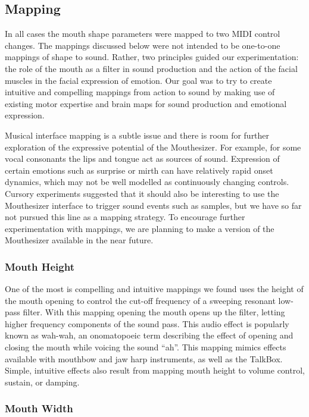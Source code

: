 \subsection{Mapping}

In all cases the mouth shape parameters were mapped to two MIDI control changes. The mappings discussed below were not intended to be one-to-one mappings of shape to sound. Rather, two principles guided our experimentation: the role of the mouth as a filter in sound production and the action of the facial muscles in the facial expression of emotion. Our goal was to try to create intuitive and compelling mappings from action to sound by making use of existing motor expertise and brain maps for sound production and emotional expression. 

Musical interface mapping is a subtle issue \cite{Hunt:2003} and there is room for further exploration of the expressive potential of the Mouthesizer. For example, for some vocal consonants the lips and tongue act as sources of sound. Expression of certain emotions such as surprise or mirth can have relatively rapid onset dynamics, which may not be well modelled as continuously changing controls. Cursory experiments suggested that it should also be interesting to use the Mouthesizer interface to trigger sound events such as samples, but we have so far not pursued this line as a mapping strategy. To encourage further experimentation with mappings, we are planning to make a version of the Mouthesizer available in the near future.

\subsubsection{Mouth Height}

One of the most is compelling and intuitive mappings we found uses the height of the mouth opening to control the cut-off frequency of a sweeping resonant low-pass filter. With this mapping opening the mouth opens up the filter, letting higher frequency components of the sound pass. This audio effect is popularly known as wah-wah, an onomatopoeic term describing the effect of opening and closing the mouth while voicing the sound “ah”. This mapping mimics effects available with mouthbow and jaw harp instruments, as well as the TalkBox. Simple, intuitive effects also result from mapping mouth height to volume control, sustain, or damping.

\subsubsection{Mouth Width}

